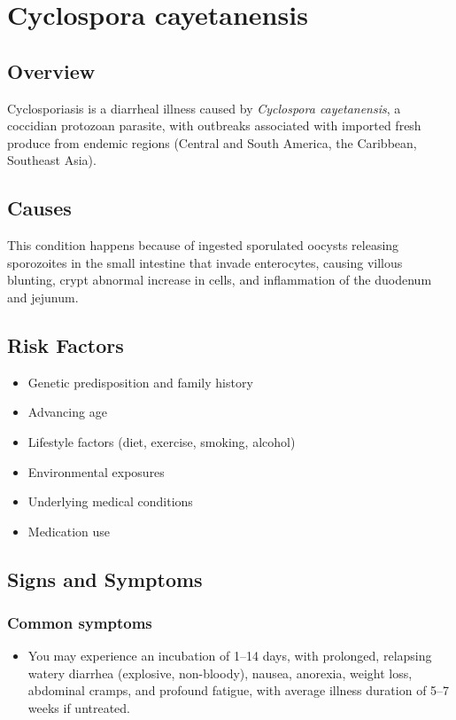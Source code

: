 \chapter{Cyclospora cayetanensis}
\label{sec:Cyclospora}

\section{Overview}
Cyclosporiasis is a diarrheal illness caused by \textit{Cyclospora cayetanensis}, a coccidian protozoan parasite, with outbreaks associated with imported fresh produce from endemic regions (Central and South America, the Caribbean, Southeast Asia).
\section{Causes}
This condition happens because of ingested sporulated oocysts releasing sporozoites in the small intestine that invade enterocytes, causing villous blunting, crypt abnormal increase in cells, and inflammation of the duodenum and jejunum.     
\section{Risk Factors}

\begin{itemize}[noitemsep]
  \item Genetic predisposition and family history
  \item Advancing age
  \item Lifestyle factors (diet, exercise, smoking, alcohol)
  \item Environmental exposures
  \item Underlying medical conditions
  \item Medication use
\end{itemize}
\section{Signs and Symptoms}

\subsection{Common symptoms}
\begin{itemize}[noitemsep]
  \item You may experience an incubation of 1--14 days, with prolonged, relapsing watery diarrhea (explosive, non-bloody), nausea, anorexia, weight loss, abdominal cramps, and profound fatigue, with average illness duration of 5--7 weeks if untreated. 
  \end{itemize}

